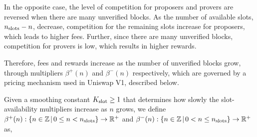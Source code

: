 \documentclass[9pt,oneside]{amsart}
\begin{document}
\begin{multicols}{2}
In the opposite case, the level of competition for proposers and provers are reversed when there are many unverified blocks. As the number of available slots, $n_\textnormal{slots}-n$, decrease, competition for the remaining slots increase for proposers, which leads to higher fees. Further, since there are many unverified blocks, competition for provers is low, which results in higher rewards. 


Therefore, fees and rewards increase as the number of unverified blocks grow, through multipliers $\beta^+(n)$ and $\beta^-(n)$ respectively, which are governed by a 
pricing mechanism used in Uniswap V1, described below.

Given a smoothing constant $K_\textnormal{slot} \geq 1$ that determines how slowly the slot-availability multipliers increase as $n$ grows, 
we define $\beta^+(n): \{n\in \mathbb{Z} \hspace{0.02in}|\hspace{0.02in}  0 \leq n < n_\textnormal{slots} \}\rightarrow \mathbb{R}^+$ and $\beta^-(n): \{n\in \mathbb{Z} \hspace{0.02in}|\hspace{0.02in}  0 < n \leq n_\textnormal{slots} \}\rightarrow \mathbb{R}^+$ as, 


\end{multicols}
\end{document}
